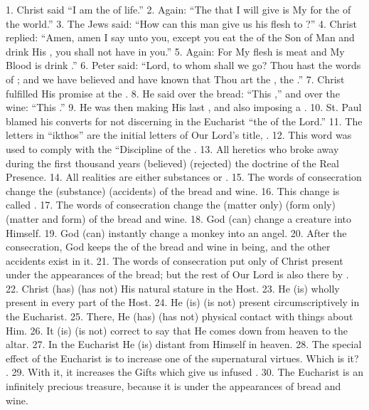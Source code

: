\documentclass[a5paper]{article}
\newcommand\answer[1]{\textbf{\textit{#1}}}
\begin{document}
1. Christ said “I am the \answer{} of life.” 2. Again: “The \answer{}  that  I
will give is My \answer{} for the \answer{} of the world.” 3. The  Jews  said:
“How can this man give us his flesh to \answer{}?” 4. Christ replied:  “Amen,
amen I say unto you, except you eat the \answer{}  of  the  Son  of  Man  and
drink His \answer{}, you shall not have \answer{} in you.” 5.  Again:  For  My
flesh is meat \answer{} and My Blood  is  drink  \answer{}.”  6.  Peter  said:
“Lord, to whom shall we go? Thou hast the words of  \answer{};  and  we  have
believed and have known that  Thou  art  the  \answer{},  the  \answer{}.”  7.
Christ fulfilled His promise at the \answer{}. 8. He  said  over  the  bread:
“This \answer{},” and over the wine: “This \answer{}.” 9. He was  then  making
His last \answer{}, and also imposing a \answer{}. 10.  St.  Paul  blamed  his
converts for not discerning in the Eucharist “the  \answer{}  of  the  Lord.”
11. The letters in “ikthos” are the initial letters  of  Our  Lord's  title,
\answer{}. 12. This word was used to  comply  with  the  “Discipline  of  the
\answer{}. 13. All heretics who broke away during the  first  thousand  years
(believed) (rejected) the doctrine of the Real Presence. 14.  All  realities
are either substances or \answer{}. 15. The words of consecration change  the
(substance) (accidents) of the bread and wine. 16.  This  change  is  called
\answer{}. 17. The words of  consecration  change  the  (matter  only)  (form
only) (matter and form) of the  bread  and  wine.  18.  God  (can)  \answer{}
change a creature into Himself. 19. God (can) \answer{}  instantly  change  a
monkey into an angel. 20. After the consecration, God keeps the \answer{}  of
the bread and wine in being, and the other accidents exist in  it.  21.  The
words of  consecration  put  only  \answer{}  of  Christ  present  under  the
appearances of the bread; but  the  rest  of  Our  Lord  is  also  there  by
\answer{}. 22. Christ (has) (has not) His natural stature in  the  Host.  23.
He (is) \answer{} wholly present in every part of the Host. 24. He  (is)  (is
not) present circumscriptively in the Eucharist. 25. There,  He  (has)  (has
not) physical contact with things about Him. 26. It (is)  (is  not)  correct
to say that He comes down from heaven to the altar. 27. In the Eucharist  He
(is) \answer{} distant from Himself in heaven. 28. The special effect of  the
Eucharist is to increase one of  the  supernatural  virtues.  Which  is  it?
\answer{}. 29. With  it,  it  increases  the  Gifts  which  give  us  infused
\answer{}. 30. The Eucharist is an infinitely precious treasure,  because  it
is \answer{} under the appearances of bread and wine.
\end{document}
